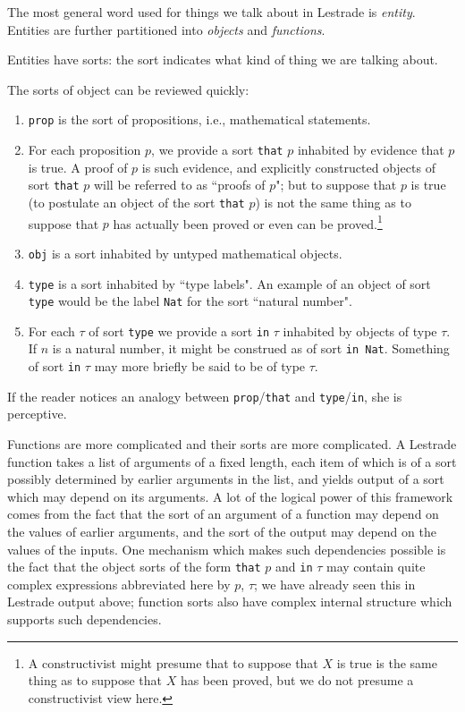 \documentclass[12pt]{article}
\begin{document}
The most general word used for things we talk about in Lestrade is {\em entity\/}.  Entities are further partitioned into {\em objects} and {\em functions}.

Entities have sorts:  the sort indicates what kind of thing we are talking about.  

The sorts of object can be reviewed quickly:

\begin{enumerate}

\item {\tt prop} is the sort of propositions, i.e., mathematical statements.

\item For each proposition $p$, we provide a sort {\tt that} $p$ inhabited by evidence that $p$ is true.  A proof of $p$ is such evidence, and explicitly constructed objects of sort {\tt that} $p$ will be referred to as ``proofs of $p$";  but to suppose that $p$ is true (to postulate an object of the sort {\tt that} $p$) is not the same thing as to suppose that $p$ has actually been proved or even can be proved.\footnote{A constructivist might presume that to suppose that $X$ is true is the same thing as to suppose that $X$ has been proved, but we do not presume a constructivist view here.}

\item {\tt obj} is a sort inhabited by untyped mathematical objects.

\item {\tt type} is a sort inhabited by ``type labels".  An example of an object of sort {\tt type} would be the label {\tt Nat} for the sort ``natural number".

\item For each $\tau$ of sort {\tt type} we provide a sort {\tt in} $\tau$ inhabited by objects of type $\tau$.  If $n$ is a natural number, it might be construed as of sort {\tt in Nat}.  Something of sort {\tt in} $\tau$ may more briefly be said to be of type $\tau$.

\end{enumerate}

If the reader notices an analogy between {\tt prop}/{\tt that} and {\tt type}/{\tt in}, she is perceptive.

Functions are more complicated and their sorts are more complicated.  A Lestrade function takes a list of arguments of a fixed length, each item of which is of a sort possibly determined by earlier arguments in the list, and yields output of a sort which may depend on its arguments.  A lot of the logical power of this framework comes from the fact that the sort of an argument of a function may depend on the values of earlier arguments, and the sort of the output may depend on the values of the inputs.  One mechanism which makes such dependencies possible is the fact that the object sorts of the form {\tt that} $p$ and {\tt in} $\tau$ may contain quite complex expressions abbreviated here by $p$, $\tau$;  we have already seen this in Lestrade output above;  function sorts also have complex internal structure which supports such dependencies.
\end{document}

